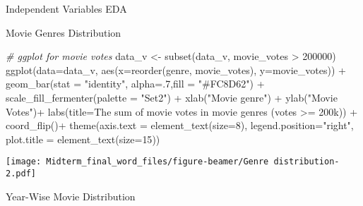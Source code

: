\documentclass[
  ignorenonframetext,
]{beamer}
\newenvironment{Shaded}{\begin{snugshade}}{\end{snugshade}}
\newcommand{\AttributeTok}[1]{\textcolor[rgb]{0.77,0.63,0.00}{#1}}
\newcommand{\CommentTok}[1]{\textcolor[rgb]{0.56,0.35,0.01}{\textit{#1}}}
\newcommand{\DecValTok}[1]{\textcolor[rgb]{0.00,0.00,0.81}{#1}}
\newcommand{\FunctionTok}[1]{\textcolor[rgb]{0.00,0.00,0.00}{#1}}
\newcommand{\NormalTok}[1]{#1}
\newcommand{\OtherTok}[1]{\textcolor[rgb]{0.56,0.35,0.01}{#1}}
\newcommand{\SpecialCharTok}[1]{\textcolor[rgb]{0.00,0.00,0.00}{#1}}
\newcommand{\StringTok}[1]{\textcolor[rgb]{0.31,0.60,0.02}{#1}}
\begin{document}
\begin{frame}[fragile]{Independent Variables EDA}
\begin{block}{Movie Genres Distribution}
\begin{Shaded}
\begin{Highlighting}[]
\CommentTok{\# ggplot for movie votes}
\NormalTok{data\_v }\OtherTok{\textless{}{-}} \FunctionTok{subset}\NormalTok{(data\_v, movie\_votes }\SpecialCharTok{\textgreater{}} \DecValTok{200000}\NormalTok{)}
\FunctionTok{ggplot}\NormalTok{(}\AttributeTok{data=}\NormalTok{data\_v, }\FunctionTok{aes}\NormalTok{(}\AttributeTok{x=}\FunctionTok{reorder}\NormalTok{(genre, movie\_votes), }\AttributeTok{y=}\NormalTok{movie\_votes)) }\SpecialCharTok{+} 
  \FunctionTok{geom\_bar}\NormalTok{(}\AttributeTok{stat =} \StringTok{"identity"}\NormalTok{, }\AttributeTok{alpha=}\NormalTok{.}\DecValTok{7}\NormalTok{,}\AttributeTok{fill =} \StringTok{"\#FC8D62"}\NormalTok{) }\SpecialCharTok{+} 
    \FunctionTok{scale\_fill\_fermenter}\NormalTok{(}\AttributeTok{palette =} \StringTok{"Set2"}\NormalTok{) }\SpecialCharTok{+} 
      \FunctionTok{xlab}\NormalTok{(}\StringTok{"Movie genre"}\NormalTok{) }\SpecialCharTok{+} \FunctionTok{ylab}\NormalTok{(}\StringTok{"Movie Votes"}\NormalTok{)}\SpecialCharTok{+} 
        \FunctionTok{labs}\NormalTok{(}\AttributeTok{title=}\StringTok{\textquotesingle{}The sum of movie votes in movie genres (votes \textgreater{}= 200k)\textquotesingle{}}\NormalTok{) }\SpecialCharTok{+} 
          \FunctionTok{coord\_flip}\NormalTok{()}\SpecialCharTok{+}
            \FunctionTok{theme}\NormalTok{(}\AttributeTok{axis.text =} \FunctionTok{element\_text}\NormalTok{(}\AttributeTok{size=}\DecValTok{8}\NormalTok{), }\AttributeTok{legend.position=}\StringTok{"right"}\NormalTok{, }\AttributeTok{plot.title =} \FunctionTok{element\_text}\NormalTok{(}\AttributeTok{size=}\DecValTok{15}\NormalTok{))}
\end{Highlighting}
\end{Shaded}

\texttt{[image: Midterm\_final\_word\_files/figure-beamer/Genre distribution-2.pdf]}
\end{block}

\begin{block}{Year-Wise Movie Distribution}
\protect\hypertarget{year-wise-movie-distribution}{}
\begin{Shaded}
\end{Shaded}
\end{block}
\end{frame}
\end{document}
